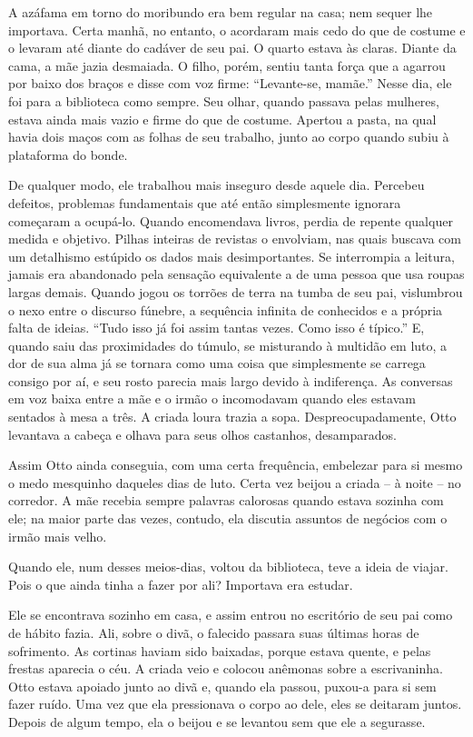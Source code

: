 A azáfama em torno do moribundo era bem regular na casa; nem sequer
lhe importava. Certa manhã, no entanto, o acordaram mais cedo do que de
costume e o levaram até diante do cadáver de seu pai. O quarto estava às
claras. Diante da cama, a mãe jazia desmaiada. O filho, porém, sentiu
tanta força que a agarrou por baixo dos braços e disse com voz firme:
``Levante-se, mamãe.'' Nesse dia, ele foi para a biblioteca como sempre.
Seu olhar, quando passava pelas mulheres, estava ainda mais vazio e
firme do que de costume. Apertou a pasta, na qual havia dois maços com
as folhas de seu trabalho, junto ao corpo quando subiu à plataforma do
bonde.

De qualquer modo, ele trabalhou mais inseguro desde aquele dia. Percebeu
defeitos, problemas fundamentais que até então simplesmente ignorara
começaram a ocupá-lo. Quando encomendava livros, perdia de repente
qualquer medida e objetivo. Pilhas inteiras de revistas o envolviam, nas
quais buscava com um detalhismo estúpido os dados mais desimportantes.
Se interrompia a leitura, jamais era abandonado pela sensação
equivalente a de uma pessoa que usa roupas largas demais. Quando jogou
os torrões de terra na tumba de seu pai, vislumbrou o nexo entre o
discurso fúnebre, a sequência infinita de conhecidos e a própria falta
de ideias. ``Tudo isso já foi assim tantas vezes. Como isso é típico.''
E, quando saiu das proximidades do túmulo, se misturando à multidão em
luto, a dor de sua alma já se tornara como uma coisa que simplesmente se
carrega consigo por aí, e seu rosto parecia mais largo devido à
indiferença. As conversas em voz baixa entre a mãe e o irmão o
incomodavam quando eles estavam sentados à mesa a três. A criada loura
trazia a sopa. Despreocupadamente, Otto levantava a cabeça e olhava para
seus olhos castanhos, desamparados.

Assim Otto ainda conseguia, com uma certa frequência, embelezar para si
mesmo o medo mesquinho daqueles dias de luto. Certa vez beijou a criada
-- à noite -- no corredor. A mãe recebia sempre palavras calorosas
quando estava sozinha com ele; na maior parte das vezes, contudo, ela
discutia assuntos de negócios com o irmão mais velho.

Quando ele, num desses meios-dias, voltou da biblioteca, teve a ideia de
viajar. Pois o que ainda tinha a fazer por ali? Importava era
estudar.

Ele se encontrava sozinho em casa, e assim entrou no escritório de seu
pai como de hábito fazia. Ali, sobre o divã, o falecido passara suas
últimas horas de sofrimento. As cortinas haviam sido baixadas, porque
estava quente, e pelas frestas aparecia o céu. A criada veio e colocou
anêmonas sobre a escrivaninha. Otto estava apoiado junto ao divã e,
quando ela passou, puxou-a para si sem fazer ruído. Uma vez que ela
pressionava o corpo ao dele, eles se deitaram juntos. Depois de algum
tempo, ela o beijou e se levantou sem que ele a segurasse.

